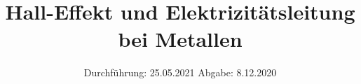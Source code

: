 

\subject{Versuch Nr.106}
\title{Hall-Effekt und Elektrizitätsleitung bei Metallen}
\date{%
  Durchführung: 25.05.2021
  \hspace{3em}
  Abgabe: 8.12.2020
}



\maketitle
\thispagestyle{empty}
\tableofcontents
\newpage 









\nocite{*}

\printbibliography


